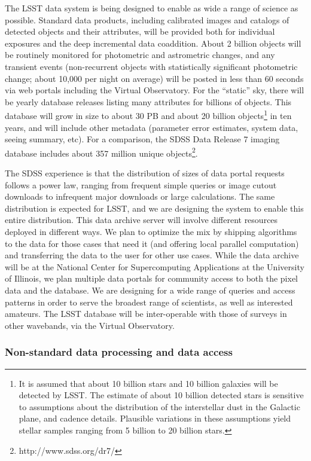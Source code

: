 \documentclass{emulateapj}
\begin{document}
The LSST data system is being designed to enable as wide a range of science as 
possible. Standard data products, including calibrated images and catalogs of
detected objects and their attributes, will be provided both for individual 
exposures and the deep incremental data coaddition. About 2 billion objects 
will be routinely monitored for photometric and astrometric changes, and any 
transient events (non-recurrent objects with statistically significant photometric 
change; about 10,000 per night on average) will be posted in less than 60 seconds 
via web portals including the Virtual Observatory. 
For the ``static'' sky, there will be yearly database releases listing many 
attributes for billions of objects. This database will grow in size to about 
30 PB and about 20 billion objects\footnote{It is assumed that about 10 billion stars
and 10 billion galaxies will be detected by LSST. The estimate of about 10 billion
detected stars is sensitive to assumptions about the distribution of the 
interstellar dust in the Galactic plane, and cadence details. Plausible variations
in these assumptions yield stellar samples 
ranging from 5 billion to 20 billion stars.} in ten years, and will 
include other metadata (parameter error estimates, system data, seeing
summary, etc). For a comparison, the SDSS Data Release 7 imaging database
includes about 357 million unique objects\footnote{http://www.sdss.org/dr7/}. 

The SDSS experience is that the distribution of sizes of data portal requests 
follows a power law, ranging from frequent simple queries or image cutout
downloads to infrequent major downloads or large calculations. The same 
distribution is expected for LSST, and we are designing the system to enable this 
entire distribution. This data archive server will involve different resources deployed 
in different ways. We plan to optimize the mix by shipping algorithms to the data 
for those cases that need it (and offering local parallel computation) and 
transferring the data to the user for other use cases. While the data archive will 
be at the National Center for Supercomputing Applications at the University of
Illinois, we plan multiple data portals for community access to both the 
pixel data and the database. We are designing for a wide range of queries and 
access patterns in order to serve the broadest range of scientists, as well as 
interested amateurs. The LSST database will be inter-operable with those of 
surveys in other wavebands, via the Virtual Observatory. 


\subsubsection{ Non-standard data processing and data access}
\end{document}
